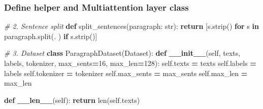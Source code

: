\documentclass[
]{article}
\newenvironment{Shaded}{\begin{snugshade}}{\end{snugshade}}
\newcommand{\BuiltInTok}[1]{#1}
\newcommand{\CommentTok}[1]{\textcolor[rgb]{0.56,0.35,0.01}{\textit{#1}}}
\newcommand{\ControlFlowTok}[1]{\textcolor[rgb]{0.13,0.29,0.53}{\textbf{#1}}}
\newcommand{\DecValTok}[1]{\textcolor[rgb]{0.00,0.00,0.81}{#1}}
\newcommand{\FunctionTok}[1]{\textcolor[rgb]{0.13,0.29,0.53}{\textbf{#1}}}
\newcommand{\KeywordTok}[1]{\textcolor[rgb]{0.13,0.29,0.53}{\textbf{#1}}}
\newcommand{\NormalTok}[1]{#1}
\newcommand{\OperatorTok}[1]{\textcolor[rgb]{0.81,0.36,0.00}{\textbf{#1}}}
\newcommand{\StringTok}[1]{\textcolor[rgb]{0.31,0.60,0.02}{#1}}
\newcommand{\VariableTok}[1]{\textcolor[rgb]{0.00,0.00,0.00}{#1}}
\begin{document}
\subsubsection{Define helper and Multiattention layer
class}\label{define-helper-and-multiattention-layer-class}

\begin{Shaded}
\begin{Highlighting}[]
\CommentTok{\# 2. Sentence split}
\KeywordTok{def}\NormalTok{ split\_sentences(paragraph: }\BuiltInTok{str}\NormalTok{):}
    \ControlFlowTok{return}\NormalTok{ [s.strip() }\ControlFlowTok{for}\NormalTok{ s }\KeywordTok{in}\NormalTok{ paragraph.split(}\StringTok{\textquotesingle{}. \textquotesingle{}}\NormalTok{) }\ControlFlowTok{if}\NormalTok{ s.strip()]}

\CommentTok{\# 3. Dataset}
\KeywordTok{class}\NormalTok{ ParagraphDataset(Dataset):}
    \KeywordTok{def} \FunctionTok{\_\_init\_\_}\NormalTok{(}\VariableTok{self}\NormalTok{, texts, labels, tokenizer, max\_sents}\OperatorTok{=}\DecValTok{16}\NormalTok{, max\_len}\OperatorTok{=}\DecValTok{128}\NormalTok{):}
        \VariableTok{self}\NormalTok{.texts }\OperatorTok{=}\NormalTok{ texts}
        \VariableTok{self}\NormalTok{.labels }\OperatorTok{=}\NormalTok{ labels}
        \VariableTok{self}\NormalTok{.tokenizer }\OperatorTok{=}\NormalTok{ tokenizer}
        \VariableTok{self}\NormalTok{.max\_sents }\OperatorTok{=}\NormalTok{ max\_sents}
        \VariableTok{self}\NormalTok{.max\_len }\OperatorTok{=}\NormalTok{ max\_len}

    \KeywordTok{def} \FunctionTok{\_\_len\_\_}\NormalTok{(}\VariableTok{self}\NormalTok{):}
        \ControlFlowTok{return} \BuiltInTok{len}\NormalTok{(}\VariableTok{self}\NormalTok{.texts)}


\end{Highlighting}
\end{Shaded}
\end{document}
